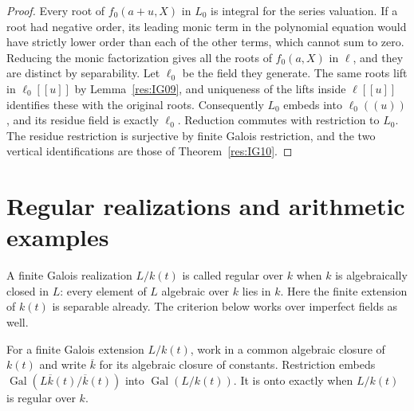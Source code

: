 \begin{proof}
Every root of \(f_0(a+u,X)\) in \(L_0\) is integral for the
series valuation. If a root had negative order, its leading monic
term in the polynomial equation would have strictly lower order
than each of the other terms, which cannot sum to zero.
Reducing the monic factorization gives all the roots of \(f_0(a,X)\)
in \(\ell\), and they are distinct by separability. Let \(\ell_0\)
be the field they generate. The same roots lift in
\(\ell_0[[u]]\) by Lemma~\ref{res:IG09}, and uniqueness of the
lifts inside \(\ell[[u]]\) identifies these with the original
roots. Consequently \(L_0\) embeds into \(\ell_0((u))\), and its
residue field is exactly \(\ell_0\). Reduction commutes with
restriction to \(L_0\). The residue restriction is surjective
by finite Galois restriction, and the two vertical identifications
are those of Theorem~\ref{res:IG10}.
\end{proof}

\section{Regular realizations and arithmetic examples}

A finite Galois realization \(L/k(t)\) is called regular over
\(k\) when \(k\) is algebraically closed in \(L\): every element
of \(L\) algebraic over \(k\) lies in \(k\).
Here the finite extension of \(k(t)\) is separable already.
The criterion below works over imperfect fields as well.

\begin{proposition}
\label{res:IG12}
For a finite Galois extension \(L/k(t)\), work in a common algebraic
closure of \(k(t)\) and write \(\overline k\) for its algebraic
closure of constants. Restriction embeds
\(\operatorname{Gal}(L\overline k(t)/\overline k(t))\) into
\(\operatorname{Gal}(L/k(t))\). It is onto exactly when \(L/k(t)\)
is regular over \(k\).
\end{proposition}

